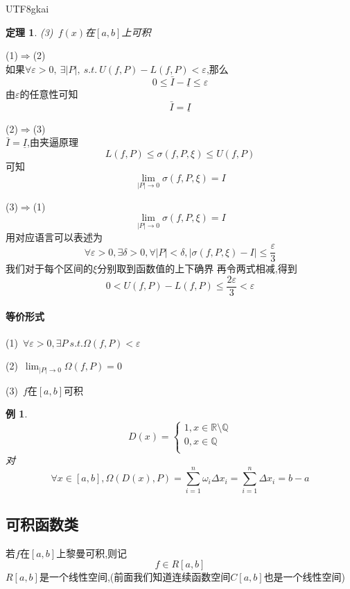 \documentclass{article}
\newtheorem{theorem}{定理}[subsection]
\newtheorem{example}{例}[subsection]
\newenvironment{cproof}{%
\heiti{证明}\kaishu
}{%
}
\newenvironment{identification}{%
\heiti{定义}\kaishu
}{%
}
\newcommand{\RR}{\mathbb{R}}
\begin{document}
\begin{CJK}{UTF8}{gkai}
\begin{theorem}
  (3)~$f(x)$在$[a,b]$上可积
\end{theorem}

\begin{cproof}
(1)$\Rightarrow$(2)\\
如果$\forall \varepsilon > 0,~\exists |P|,~s.t.~ U(f,P) - L(f,P) < \varepsilon$,那么
\[0 \leq \bar{I} - \underline{I} \leq \varepsilon\]
由$\varepsilon$的任意性可知
\[\bar{I} = \underline{I}\]

(2)$\Rightarrow$(3)\\
$\bar{I} = \underline{I}$,由夹逼原理
\[L(f,P) \leq \sigma(f,P,\xi) \leq U(f,P)\]
可知
\[\lim_{|P| \to 0} \sigma(f,P,\xi) = I\]

(3)$\Rightarrow$(1)\\
\[\lim_{|P| \to 0} \sigma(f,P,\xi) = I\]
用对应语言可以表述为
\[\forall \varepsilon > 0 ,\exists \delta > 0, \forall |P| < \delta , |\sigma(f,P,\xi) - I | \leq \dfrac{\varepsilon}{3}\]
我们对于每个区间的$\xi$分别取到函数值的上下确界
再令两式相减,得到
\[ 0 < U(f,P) - L(f,P) \leq \dfrac{2\varepsilon}{3} < \varepsilon\]
\end{cproof}

\paragraph{等价形式}

(1)~$\forall \varepsilon > 0,\exists P ~s.t. \Omega(f,P) < \varepsilon$

(2)~$\lim_{|P|\to 0} \Omega(f,P) = 0$

(3)~$f\text{在}[a,b]\text{可积}$\\

\begin{example}
  \begin{equation*}
    D(x) = 
    \begin{cases}
      1,x\in \RR\setminus \mathbb{Q}\\
      0,x\in\mathbb{Q}\\
    \end{cases}
  \end{equation*}
对\[\forall x \in [a,b],\Omega(D(x),P) = \sum_{i = 1}^{n} \omega_i \Delta x_i = \sum_{i = 1}^{n}\Delta x_i = b - a\]
\end{example}

\subsection{可积函数类}
\begin{identification}
若$f$在$[a,b]$上黎曼可积,则记
\[f\in R[a,b]\]
$R[a,b]$是一个线性空间,(前面我们知道连续函数空间$C[a,b]$也是一个线性空间)\\
\end{identification}


\end{CJK}
\end{document}
